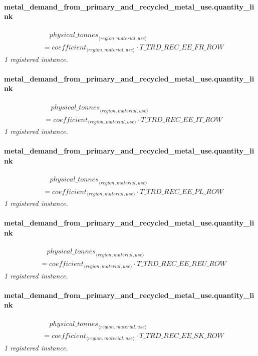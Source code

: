 \documentclass[11pt]{article}
\begin{document}
\paragraph{metal\_demand\_from\_primary\_and\_recycled\_metal\_use.quantity\_link}
\begin{align*}
&\quad {physical\_tonnes}_{\langle region, material, use\rangle}\\
&= coefficient_{\langle region, material, use\rangle} \cdot T\_TRD\_REC\_EE\_FR\_ROW
\end{align*}
\noindent\emph{1 registered instance.}\par
\paragraph{metal\_demand\_from\_primary\_and\_recycled\_metal\_use.quantity\_link}
\begin{align*}
&\quad {physical\_tonnes}_{\langle region, material, use\rangle}\\
&= coefficient_{\langle region, material, use\rangle} \cdot T\_TRD\_REC\_EE\_IT\_ROW
\end{align*}
\noindent\emph{1 registered instance.}\par
\paragraph{metal\_demand\_from\_primary\_and\_recycled\_metal\_use.quantity\_link}
\begin{align*}
&\quad {physical\_tonnes}_{\langle region, material, use\rangle}\\
&= coefficient_{\langle region, material, use\rangle} \cdot T\_TRD\_REC\_EE\_PL\_ROW
\end{align*}
\noindent\emph{1 registered instance.}\par
\paragraph{metal\_demand\_from\_primary\_and\_recycled\_metal\_use.quantity\_link}
\begin{align*}
&\quad {physical\_tonnes}_{\langle region, material, use\rangle}\\
&= coefficient_{\langle region, material, use\rangle} \cdot T\_TRD\_REC\_EE\_REU\_ROW
\end{align*}
\noindent\emph{1 registered instance.}\par
\paragraph{metal\_demand\_from\_primary\_and\_recycled\_metal\_use.quantity\_link}
\begin{align*}
&\quad {physical\_tonnes}_{\langle region, material, use\rangle}\\
&= coefficient_{\langle region, material, use\rangle} \cdot T\_TRD\_REC\_EE\_SK\_ROW
\end{align*}
\noindent\emph{1 registered instance.}\par
\end{document}
